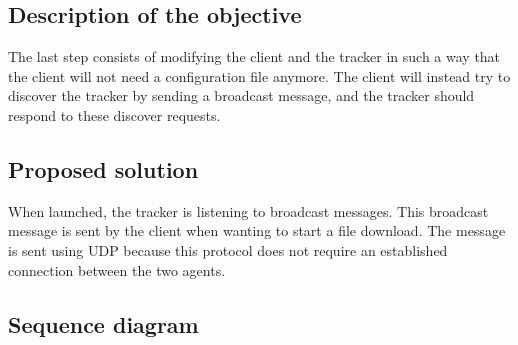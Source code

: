 \subsection{Description of the objective}

The last step consists of modifying the client and the tracker in such a way that the client will not need a configuration file anymore. The client will instead try to discover the tracker by sending a broadcast message, and the tracker should respond to these discover requests.

\subsection{Proposed solution}

When launched, the tracker is listening to broadcast messages. This broadcast message is sent by the client when wanting to start a file download. The message is sent using UDP because this protocol does not require an established connection between the two agents.

\subsection{Sequence diagram}